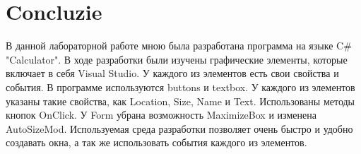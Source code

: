 \section*{Concluzie}
{}
В данной лабораторной работе мною была разработана программа на языке C\# "Calculator". В ходе разработки были изучены графические элементы, которые включает в себя Visual Studio. У каждого из элементов есть свои свойства и события. В программе используются buttons и textbox. У каждого из элементов указаны такие свойства, как Location, Size, Name и Text. Использованы методы кнопок OnClick. У Form убрана возможность MaximizeBox и изменена AutoSizeMod. Используемая среда разработки позволяет очень быстро и удобно создавать окна, а так же использовать события каждого из элементов.

\clearpage